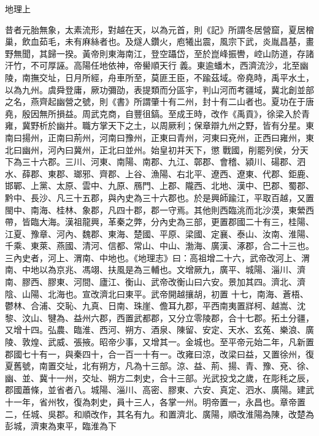 
\begin{pinyinscope}

 地理上


昔者元胎無象，太素流形，對越在天，以為元首，則《記》所謂冬居營窟，夏居橧巢，飲血茹毛，未有麻絲者也。及燧人鑽火，庖犧出震，風宗下武，炎胤昌基，畫野無聞，其歸一揆。黃帝則東海南江，登空躡岱，至於崑峰振轡，崆山防道，存諸汗竹，不可厚誣。高陽任地依神，帝嚳順天行
 義。東逾蟠木，西濟流沙，北至幽陵，南撫交址，日月所經，舟車所至，莫匪王臣，不踰茲域。帝堯時，禹平水土，以為九州。虞舜登庸，厥功彌劭，表提類而分區宇，判山河而考疆域，冀北創並部之名，燕齊起幽營之號，則《書》所謂肇十有二州，封十有二山者也。夏功在于唐堯，殷因無所損益。周武克商，自豐徂鎬。至成王時，改作《禹貢》，徐梁入於青雍，冀野析於幽并。職方掌天下之土，以周厥利；保章辯九州之野，皆有分星。東南曰揚州，正南曰荊州，河南曰豫州，正東曰青州，河東曰兗州，正西曰雍州，東北曰幽州，河內曰冀州，正北曰並州。始皇初并天下，懲
 戰國，削罷列侯，分天下為三十六郡。三川、河東、南陽、南郡、九江、鄣郡、會稽、潁川、碭郡、泗水、薛郡、東郡、瑯邪、齊郡、上谷、漁陽、右北平、遼西、遼東、代郡、鉅鹿、邯鄲、上黨、太原、雲中、九原、鴈門、上郡、隴西、北地、漢中、巴郡、蜀郡、黔中、長沙、凡三十五郡，與內史為三十六郡也。於是興師踰江，平取百越，又置閩中、南海、桂林、象郡，凡四十郡，郡一守焉。其他則西臨洮而北沙漠，東縈西帶，皆臨大海。漢祖龍興，革秦之弊，分內史為三部，更置郡國二十有三，桂陽、江夏、豫章、河內、魏郡、東海、楚國、平原、梁國、定襄、泰山、汝南、淮陽、千乘、東萊、燕國、清河、信都、常山、中山、渤海、廣漢、涿郡，合二十三也。三內史者，河上、渭南、中地也。《地理志》曰：高祖增二十六，武帝改河上、渭南、中地以為京兆、馮翊、扶風是為三輔也。文增厥九，廣平、城陽、淄川、濟南、膠西、膠東、河間、廬江、衡山、武帝改衡山曰六安。景加其四。濟北、濟陰、山陽、北海也。宣改濟北曰東平。武帝開越攘胡，初置
 十七，南海、蒼梧、鬱林、合浦、交恥、九真、日南、珠崖、儋耳九郡，平西南夷置牂柯、越嵩、沈黎、汶山、犍為、益州六郡，西置武都郡，又分立零陵郡，合十七郡。拓土分疆，又增十四。弘農、臨淮、西河、朔方、酒泉、陳留、安定、天水、玄菟、樂浪、廣陵、敦煌、武威、張掖。昭帝少事，又增其一。金城也。至平帝元始二年，凡新置郡國七十有一，與秦四十，合一百一十有一。改雍曰涼，改梁曰益，又置徐州，復夏舊號，南置交址，北有朔方，凡為十三部。涼、益、荊、揚、青、豫、兗、徐、幽、並、冀十一州，交址、朔方二刺史，合十三部。光武投戈之歲，在彫秏之辰，郡國蕭條，並省者八。城陽、淄川、高密、膠東、六安、真定、泗水、廣陽。建武十一年，省州牧，復為刺史，員十三人，各掌一州。明帝置一，永昌也。章帝置二，任城、吳郡。和順改作，其名有九。和置濟北、廣陽，順改淮陽為陳，改楚為彭城，濟東為東平，臨淮為下

\end{pinyinscope}
